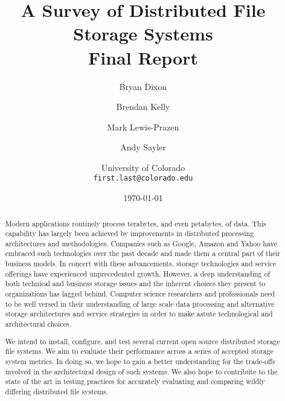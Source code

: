 \documentclass[11pt]{article}
\begin{document}
\title{
  A Survey of Distributed File Storage Systems\\
  Final Report
}
\author{
  Bryan Dixon \and Brendan Kelly \and Mark Lewis-Prazen \and Andy Sayler\\
  \and University of Colorado\\
  \texttt{first.last@colorado.edu}
}
\date{\today}

\maketitle

\begin{abstract}
Modern applications routinely process terabytes, and even petabytes, 
of data. This capability has largely been achieved by improvements in 
distributed processing architectures and methodologies. Companies such 
as Google, Amazon and Yahoo have embraced such technologies over the 
past decade and made them a central part of their business models. In 
concert with these advancements, storage technologies and service 
offerings have experienced unprecedented growth. 
However, a deep understanding of both technical and business storage 
issues and the inherent choices they present to organizations has 
lagged behind. Computer science researchers and professionals 
need to be well versed in their understanding of large scale data 
processing and alternative storage architectures and service strategies 
in order to make astute technological and architectural choices. 

We intend to install, configure, and test several current 
open source distributed storage file systems. We aim to evaluate their 
performance across a series of accepted storage system metrics. In 
doing so, we hope to gain a better understanding for the trade-offs 
involved in the architectural design of such systems. We also hope to
contribute to the state of the art in testing practices for accurately
evaluating and comparing wildly differing distributed file systems.

\end{abstract}

\newpage
\end{document}
